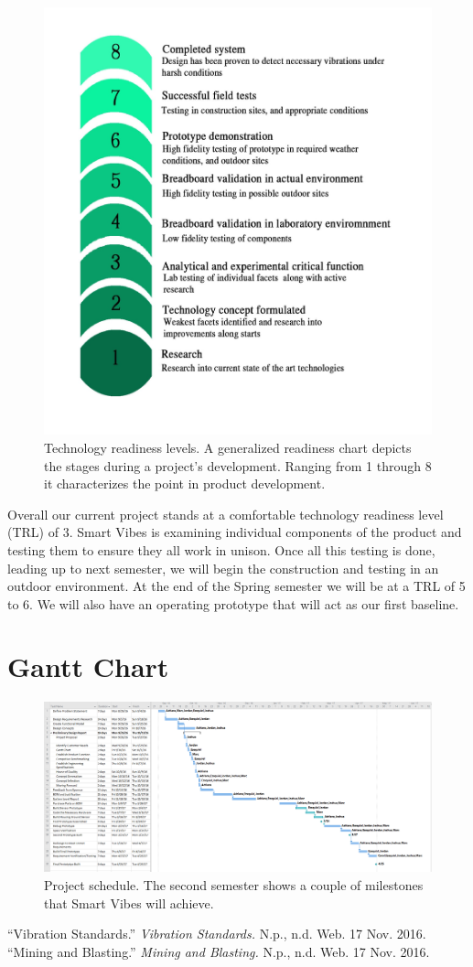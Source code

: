 \documentclass[12pt]{article}
\begin{document}
\begin{figure}[H]
    \centering
    \includegraphics[width=.7\textwidth]{src/tr_level.png}
    \caption{Technology readiness levels. A generalized readiness chart depicts the stages during a project's development. Ranging from 1 through 8 it characterizes the point in product development.}
    \label{fig:tr_level}
\end{figure}

Overall our current project stands at a comfortable technology readiness level (TRL) of 3. Smart Vibes is examining individual components of the product and testing them to ensure they all work in unison. Once all this testing is done, leading up to next semester, we will begin the construction and testing in an outdoor environment. At the end of the Spring semester we will be at a TRL of 5 to 6. We will also have an operating prototype that will act as our first baseline.

\newpage
\section{Gantt Chart}
\begin{figure}[H]
    \centering
    \includegraphics[width=\textwidth, angle=90]{src/gantt_chart.png}
    \caption{Project schedule. The second semester shows a couple of milestones that Smart Vibes will achieve.}
    \label{fig:gantt_chart}
\end{figure}

\newpage
\begin{thebibliography}{9}
``Vibration Standards.'' \textit{Vibration Standards.} N.p., n.d. Web. 17 Nov. 2016.
``Mining and Blasting.'' \textit{Mining and Blasting.} N.p., n.d. Web. 17 Nov. 2016.
\end{thebibliography}
\end{document}
